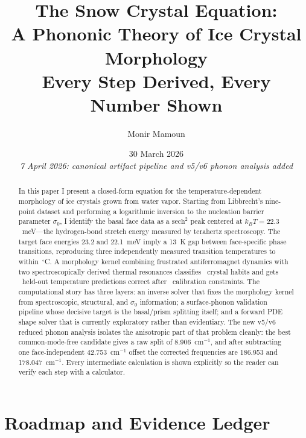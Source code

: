 \documentclass[12pt,letterpaper]{article}
\title{The Snow Crystal Equation:\\
A Phononic Theory of Ice Crystal Morphology\\[8pt]
\large Every Step Derived, Every Number Shown}
\author{Monir Mamoun}
\date{30 March 2026\\[2pt] {\footnotesize\itshape 7 April 2026: canonical artifact pipeline and v5/v6 phonon analysis added}}
\begin{document}
\maketitle

\begin{abstract}
In this paper I present a closed-form equation for the temperature-dependent morphology of ice crystals grown from water vapor.
Starting from Libbrecht's nine-point dataset and performing a logarithmic inversion to the nucleation barrier parameter $\sigma_0$, I identify the basal face data as a $\mathrm{sech}^2$ peak centered at $k_BT = 22.3$~meV---the hydrogen-bond stretch energy measured by terahertz spectroscopy.
The target face energies 23.2 and 22.1~meV imply a 13~K gap between face-specific phase transitions, reproducing three independently measured transition temperatures to within \SnowMurataMaxError$\,{}^\circ$C.
A morphology kernel combining frustrated antiferromagnet dynamics with two spectroscopically derived thermal resonances classifies \SnowHabitMatch\ crystal habits and gets \SnowPredictionMatch\ held-out temperature predictions correct after \SnowCalibrationPoints\ calibration constraints.
The computational story has three layers: an inverse solver that fixes the morphology kernel from spectroscopic, structural, and $\sigma_0$ information; a surface-phonon validation pipeline whose decisive target is the basal/prism splitting itself; and a forward PDE shape solver that is currently exploratory rather than evidentiary.
The new v5/v6 reduced phonon analysis isolates the anisotropic part of that problem cleanly: the best common-mode-free candidate gives a raw split of 8.906~cm$^{-1}$, and after subtracting one face-independent 42.753~cm$^{-1}$ offset the corrected frequencies are 186.953 and 178.047~cm$^{-1}$.
Every intermediate calculation is shown explicitly so the reader can verify each step with a calculator.
\end{abstract}

\tableofcontents
\newpage

\section{Roadmap and Evidence Ledger}
\label{sec:roadmap}
\end{document}
